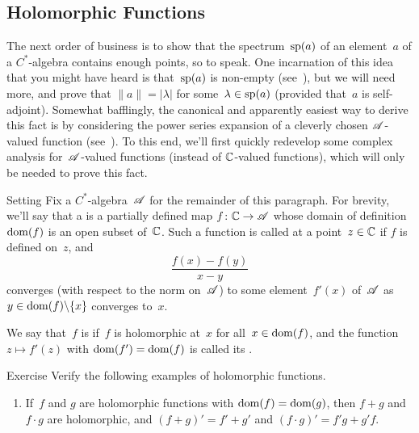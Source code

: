 \documentclass[a]{subfiles}
\begin{document}
\subsection{Holomorphic Functions}
\begin{parsec}%
\begin{point}%
The next order of business
is to show that the spectrum~$\mathrm{sp}(a)$ of an element~$a$
of a $C^*$-algebra contains enough points, so to speak.
One incarnation of this idea that you might have heard
is that~$\mathrm{sp}(a)$ is non-empty
(see~), but
we will need more,
and prove that  $\|a\|=\left|\lambda\right|$
for some~$\lambda\in\mathrm{sp}(a)$
(provided that~$a$ is self-adjoint).
Somewhat bafflingly,
the canonical and apparently
easiest way to derive this fact is by considering the power series
expansion of a cleverly chosen $\mathscr{A}$-valued function
(see~).
To this end,
we'll first quickly redevelop some complex analysis
for~$\mathscr{A}$-valued functions
(instead of $\mathbb{C}$-valued functions),
which will only be needed to prove this fact.
\end{point}
\begin{point}{Setting}%
Fix a $C^*$-algebra~$\mathscr{A}$ for the remainder of this paragraph.
For brevity,
we'll say that a %
is a partially defined map $f\colon \mathbb{C}\to \mathscr{A}$
whose domain of definition $\operatorname{dom}(f)$%
is an open subset of~$\mathbb{C}$.
Such a function is called  at a point~$z\in \mathbb{C}$%
%
if $f$ is defined on~$z$,
and 
\begin{equation*}
\frac{f(x)-f(y)}{x-y}
\end{equation*}
converges (with respect to the norm on~$\mathscr{A}$)
to some element~$f'(x)$ of~$\mathscr{A}$
as $y\in \operatorname{dom}(f)\backslash\{x\}$
converges to~$x$.

We say that~$f$ is 
if~$f$ is holomorphic at~$x$ for all~$x\in \operatorname{dom}(f)$,
and the function $z\mapsto f'(z)$
with $\operatorname{dom}(f')=\operatorname{dom}(f)$
is called its .%
%
\end{point}
\begin{point}{Exercise}%
Verify the following examples of holomorphic functions.
\begin{enumerate}
\item
If~$f$ and $g$ are holomorphic functions with $\operatorname{dom}(f)=\operatorname{dom}(g)$,
then $f+g$ and $f\cdot g$ are holomorphic,
and $(f+g)'=f'+g'$ and $(f\cdot g)' = f'g+g'f$.


\end{enumerate}
\end{point}
\end{parsec}
\end{document}
